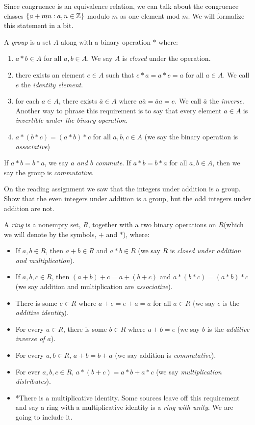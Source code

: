 \documentclass[letterpaper, 11 pt]{article}
\begin{document}
Since congruence is an equivalence relation, we can talk about the congruence classes $\{a+mn:a,n\in\mathbb Z\}$ modulo $m$ as one element mod $m$. We will formalize this statement in a bit.

\begin{defn}
A \emph{group} is a set $A$ along with a binary operation $*$ where:
\begin{enumerate}
 \item $a*b\in A$ for all $a, b\in A$. We say $A$ is \emph{closed} under the operation.
 \item there exists an element $e\in A$ such that $e*a=a*e=a$ for all $a\in A$. We call $e$ the \emph{identity element}.
 \item for each $a\in A$, there exists $\overline{a}\in A$ where $a\overline{a}=\overline{a}a=e$. We call $\overline{a}$ the \emph{inverse}. Another way to phrase this requirement is to say that every element $a\in A$ is \emph{invertible under the binary operation}.
 \item $a*(b*c)=(a*b)*c$ for all $a,b,c\in A$ (we say the binary operation is \emph{associative})
\end{enumerate}
If $a*b=b*a$, we say \emph{$a$ and $b$ commute}. If $a*b=b*a$ for all $a,b\in A$, then we say the group is \emph{commutative}.
\end{defn}

On the reading assignment we saw that the integers under addition is a group. Show that the even integers under addition is a group, but the odd integers under addition are not.
 
\begin{defn}
 A \emph{ring} is a nonempty set, $R$, together with a two binary operations on $R$(which we will denote by the symbols, $+$ and $*$), where:
\begin{itemize}
 \item If $a,b\in R$, then $a+b\in R$ and $a*b\in R$ (we say $R$ is \emph{closed under addition and multiplication}).
 \item If $a,b, c\in R$, then $(a+b)+c=a+(b+c)$ and $a*(b*c)=(a*b)*c$ (we say addition and multiplication are \emph{associative}).
 \item There is some $e\in R$ where $a+e=e+a=a$ for all $a\in R$ (we say $e$ is the \emph{additive identity}).
 \item For every $a\in R$, there is some $b\in R$ where $a+b=e$ (we say $b$ is the \emph{additive inverse of $a$}). 
 \item For every $a,b\in R$, $a+b=b+a$ (we say addition is \emph{commutative}).
 \item For ever $a,b,c\in R$, $a*(b+c)=a*b+a*c$ (we say \emph{multiplication distributes}).
 \item *There is a multiplicative identity. Some sources leave off this requirement and say a ring with a multiplicative identity is a \emph{ring with unity}. We are going to include it.
\end{itemize}
\end{defn}
\end{document}
